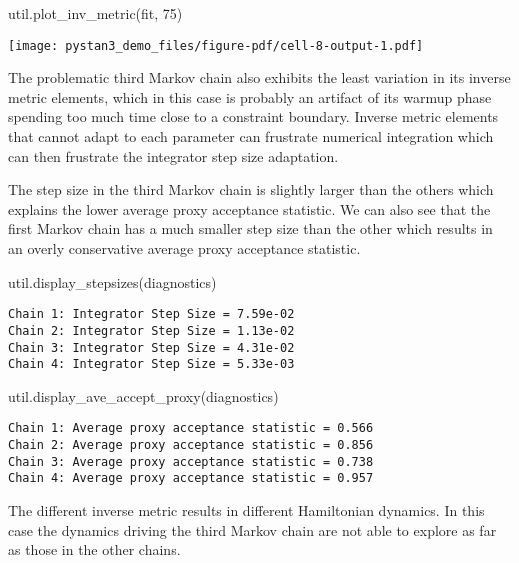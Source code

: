 \documentclass[
  letterpaper,
  DIV=11,
  numbers=noendperiod]{scrartcl}
\newenvironment{Shaded}{\begin{snugshade}}{\end{snugshade}}
\newcommand{\DecValTok}[1]{\textcolor[rgb]{0.68,0.00,0.00}{#1}}
\newcommand{\NormalTok}[1]{\textcolor[rgb]{0.00,0.23,0.31}{#1}}
\begin{document}
\begin{Shaded}
\begin{Highlighting}[]
\NormalTok{util.plot\_inv\_metric(fit, }\DecValTok{75}\NormalTok{)}
\end{Highlighting}
\end{Shaded}

\texttt{[image: pystan3\_demo\_files/figure-pdf/cell-8-output-1.pdf]}

The problematic third Markov chain also exhibits the least variation in
its inverse metric elements, which in this case is probably an artifact
of its warmup phase spending too much time close to a constraint
boundary. Inverse metric elements that cannot adapt to each parameter
can frustrate numerical integration which can then frustrate the
integrator step size adaptation.

The step size in the third Markov chain is slightly larger than the
others which explains the lower average proxy acceptance statistic. We
can also see that the first Markov chain has a much smaller step size
than the other which results in an overly conservative average proxy
acceptance statistic.

\begin{Shaded}
\begin{Highlighting}[]
\NormalTok{util.display\_stepsizes(diagnostics)}
\end{Highlighting}
\end{Shaded}

\begin{verbatim}
Chain 1: Integrator Step Size = 7.59e-02
Chain 2: Integrator Step Size = 1.13e-02
Chain 3: Integrator Step Size = 4.31e-02
Chain 4: Integrator Step Size = 5.33e-03
\end{verbatim}

\begin{Shaded}
\begin{Highlighting}[]
\NormalTok{util.display\_ave\_accept\_proxy(diagnostics)}
\end{Highlighting}
\end{Shaded}

\begin{verbatim}
Chain 1: Average proxy acceptance statistic = 0.566
Chain 2: Average proxy acceptance statistic = 0.856
Chain 3: Average proxy acceptance statistic = 0.738
Chain 4: Average proxy acceptance statistic = 0.957
\end{verbatim}

The different inverse metric results in different Hamiltonian dynamics.
In this case the dynamics driving the third Markov chain are not able to
explore as far as those in the other chains.
\end{document}
